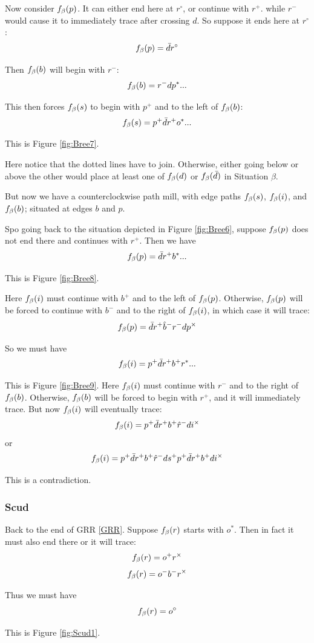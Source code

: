 Now consider $f_\beta(p)$. It can either end here at $r^\circ$, or continue with $r^+$. while $r^-$ would cause it to immediately trace after crossing $d$. So suppose it ends here at $r^\circ$:
\[
f_\beta(p) = \bar{d} r^\circ
\]

Then $f_\beta(b)$ will begin with $r^-$:
\[
f_\beta(b) = r^- d p^*...
\]

This then forces $f_\beta(s)$ to begin with $p^+$ and to the left of $f_\beta(b)$:
\[
f_\beta(s) = p^+ \bar{d} r^+ o^*...
\]

This is Figure \ref{fig:Bree7}.

Here notice that the dotted lines have to join. Otherwise, either going below or above the other would place at least one of $f_\beta(d)$ or $f_\beta(\bar{d})$ in Situation $\beta$.

But now we have a counterclockwise path mill, with edge paths $f_\beta(s)$, $f_\beta(i)$, and $f_\beta(b)$; situated at edges $b$ and $p$.  

Spo going back to the situation depicted in Figure \ref{fig:Bree6}, suppose $f_\beta(p)$ does not end there and continues with $r^+$. Then we have
\[
f_\beta(p) = \bar{d} r^+ b^*...
\]

This is Figure \ref{fig:Bree8}.

Here $f_\beta(i)$ must continue with $b^+$ and to the left of $f_\beta(p)$. Otherwise, $f_\beta(p)$ will be forced to continue with $b^-$ and to the right of $f_\beta(i)$, in which case it will trace:
\[
f_\beta(p) = \bar{d} r^+ \hat{b}^-r^- d p^\times
\]

So we must have
\[
f_\beta(i) = p^+ \bar{d} r^+ b^+ r^*...
\]

This is Figure \ref{fig:Bree9}. Here $f_\beta(i)$ must continue with $r^-$ and to the right of $f_\beta(b)$. Otherwise, $f_\beta(b)$ will be forced to begin with $r^+$, and it will immediately trace. But now $f_\beta(i)$ will eventually trace:
\[
f_\beta(i) = p^+ \bar{d} r^+ b^+ \hat{r}^- d i^\times
\]
or
\[
f_\beta(i) = p^+ \bar{d} r^+ b^+ \hat{r}^- d s^+ p^+ \bar{d} r^+ b^+ d i^\times
\]

This is a contradiction.

\subsubsection{Scud}\label{Scud}
Back to the end of GRR \ref{GRR}. Suppose $f_\beta(r)$ starts with $o^*$. Then in fact it must also end there or it will trace:
\[
f_\beta(r) = o^+ r^\times
\]
\[
f_\beta(r) = o^- b^- r^\times
\]

Thus we must have
\[
f_\beta(r) = o^\circ
\]

This is Figure \ref{fig:Scud1}.

